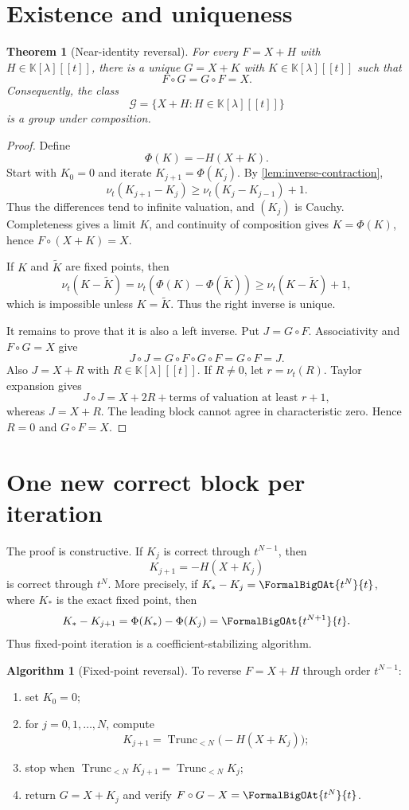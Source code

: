 \documentclass[11pt,openany]{book}
\theoremstyle{definition}
\newtheorem{algorithm}{Algorithm}[chapter]
\theoremstyle{plain}
\newtheorem{theorem}{Theorem}[chapter]
\theoremstyle{remark}
\newcommand{\K}{\mathbb{K}}
\newcommand{\val}{\nu}
\DeclareMathOperator{\trunc}{Trunc}
\begin{document}
\section{Existence and uniqueness}
\begin{theorem}[Near-identity reversal]\label{thm:near-id-inverse}
For every \(F=X+H\) with \(H\in\K[\lambda][[t]]\), there is a unique \(G=X+K\) with \(K\in\K[\lambda][[t]]\) such that
\[
 F\circ G=G\circ F=X.
\]
Consequently, the class
\[
 \mathcal G=\{X+H:H\in\K[\lambda][[t]]\}
\]
is a group under composition.
\end{theorem}

\begin{proof}
Define
\[
 \Phi(K)=-H(X+K).
\]
Start with \(K_0=0\) and iterate \(K_{j+1}=\Phi(K_j)\). By \cref{lem:inverse-contraction},
\[
 \val_t(K_{j+1}-K_j)\ge\val_t(K_j-K_{j-1})+1.
\]
Thus the differences tend to infinite valuation, and \((K_j)\) is Cauchy. Completeness gives a limit \(K\), and continuity of composition gives \(K=\Phi(K)\), hence \(F\circ(X+K)=X\).

If \(K\) and \(\widetilde K\) are fixed points, then
\[
 \val_t(K-\widetilde K)
 =\val_t(\Phi(K)-\Phi(\widetilde K))
 \ge\val_t(K-\widetilde K)+1,
\]
which is impossible unless \(K=\widetilde K\). Thus the right inverse is unique.

It remains to prove that it is also a left inverse. Put \(J=G\circ F\). Associativity and \(F\circ G=X\) give
\[
 J\circ J=G\circ F\circ G\circ F=G\circ F=J.
\]
Also \(J=X+R\) with \(R\in\K[\lambda][[t]]\). If \(R\ne0\), let \(r=\val_t(R)\). Taylor expansion gives
\[
 J\circ J=X+2R+\text{terms of valuation at least }r+1,
\]
whereas \(J=X+R\). The leading block cannot agree in characteristic zero. Hence \(R=0\) and \(G\circ F=X\).
\end{proof}

\section{One new correct block per iteration}
The proof is constructive. If \(K_j\) is correct through \(t^{N-1}\), then
\[
 K_{j+1}=-H(X+K_j)
\]
is correct through \(t^N\). More precisely, if \(K_*-K_j=\FormalBigOAt{t^N}{t}\), where \(K_*\) is the exact fixed point, then
\[
 K_*-K_{j+1}
 =\Phi(K_*)-\Phi(K_j)=\FormalBigOAt{t^{N+1}}{t}.
\]
Thus fixed-point iteration is a coefficient-stabilizing algorithm.

\begin{algorithm}[Fixed-point reversal]\label{alg:fixed-reversal}
To reverse \(F=X+H\) through order \(t^{N-1}\):
\begin{enumerate}
\item set \(K_0=0\);
\item for \(j=0,1,\ldots,N\), compute
\[
 K_{j+1}=\trunc_{<N}\bigl(-H(X+K_j)\bigr);
\]
\item stop when \(\trunc_{<N}K_{j+1}=\trunc_{<N}K_j\);
\item return \(G=X+K_j\) and verify \(F\circ G-X=\FormalBigOAt{t^N}{t}\).
\end{enumerate}
\end{algorithm}
\end{document}
